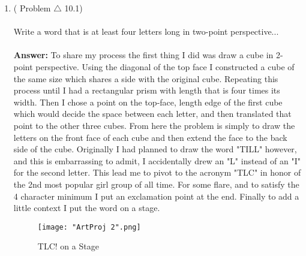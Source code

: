 \documentclass[12pt]{amsart}
\theoremstyle{remark}
\theoremstyle{mycomment}
\begin{document}
\begin{enumerate}
\vspace{1in}


\item( Problem $\triangle$ 10.1)\\
\\
 Write a word that is at least four letters long in two-point perspective... \\\\
\textbf{Answer:} To share my process the first thing I did was draw a cube in 2-point perspective. Using the diagonal of the top face I constructed a cube of the same size which shares a side with the original cube. Repeating this process until I had a rectangular prism with length that is four times its width. Then I chose a point on the top-face, length edge of the first cube which would decide the space between each letter, and then translated that point to the other three cubes. From here the problem is simply to draw the letters on the front face of each cube and then extend the face to the back side of the cube. Originally I had planned to draw the word "TILL" however, and this is embarrassing to admit, I accidentally drew an "L" instead of an "I" for the second letter. This lead me to pivot to the acronym "TLC" in honor of the 2nd most popular girl group of all time. For some flare, and to satisfy the 4 character minimum I put an exclamation point at the end. Finally to add a little context I put the word on a stage.\\
\begin{figure}[H]
\caption{TLC! on a Stage}
\centering
\texttt{[image: "ArtProj 2".png]}
\end{figure}

\vspace{1in}


\end{enumerate}
 
\end{document}
